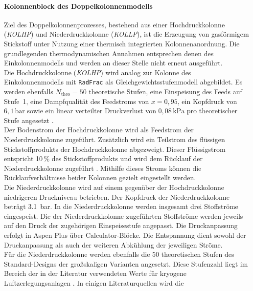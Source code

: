 \paragraph{Kolonnenblock des Doppelkolonnenmodells}\label{sec:modell_kolonne_double} Ziel des Doppelkolonnenprozesses, bestehend aus einer Hochdruckkolonne (\textit{KOLHP}) und Niederdruckkolonne (\textit{KOLLP}), ist die Erzeugung von gasförmigem Stickstoff unter Nutzung einer thermisch integrierten Kolonnenanordnung. Die grundlegenden thermodynamischen Annahmen entsprechen denen des Einkolonnenmodells und werden an dieser Stelle nicht erneut ausgeführt.\\
Die Hochdruckkolonne (\textit{KOLHP}) wird analog zur Kolonne des
Einkolonnenmodells mit \texttt{RadFrac} als Gleichgewichtsstufenmodell
abgebildet. Es werden ebenfalls \(N_{\text{theo}}=50\) theoretische Stufen,
eine Einspeisung des Feeds auf Stufe~1, eine Dampfqualität des Feedstroms von
\(x=0{,}95\), ein Kopfdruck von \(6{,}1\,\mathrm{bar}\) sowie ein linear
verteilter Druckverlust von \(0{,}08\,\mathrm{kPa}\) pro theoretischer Stufe
angesetzt \cite{heinz-wolfgangharingAirGasesNitrogen200}.\\
Der Bodenstrom der Hochdruckkolonne wird als Feedstrom der Niederdruckkolonne zugeführt. Zusätzlich wird ein Teilstrom des flüssigen Stickstoffprodukts der Hochdruckkolonne abgezweigt. Dieser Flüssigstrom entspricht 10\,\% des Stickstoffprodukts und wird dem Rücklauf der Niederdruckkolonne zugeführt \cite{agrawalProductionMediumPressure1991}. Mithilfe dieses Stroms können die Rücklaufverhältnisse beider Kolonnen gezielt eingestellt werden.\\
Die Niederdruckkolonne wird auf einem gegenüber der Hochdruckkolonne niedrigeren Druckniveau betrieben. Der Kopfdruck der Niederdruckkolonne beträgt \SI{3,1}{\bar}. In die Niederdruckkolonne werden insgesamt drei Stoffströme eingespeist.
Die der Niederdruckkolonne zugeführten Stoffströme werden jeweils auf den Druck der zugehörigen Einspeisestufe angepasst. Die Druckanpassung erfolgt in Aspen Plus über Calculator-Blöcke. Die Entspannung dient sowohl der Druckanpassung als auch der weiteren Abkühlung der jeweiligen Ströme.\\
Für die Niederdruckkolonne werden ebenfalls die \(50\) theoretischen Stufen des Standard-Designs der großskaligen Varianten angesetzt. Diese Stufenzahl liegt im Bereich der in der Literatur verwendeten Werte für kryogene Luftzerlegungsanlagen
\cite{teschExergybasedMethodsApplied, agrawalEfficientCryogenicNitrogen1991,
vanderhamExergyAnalysisTwo2010}. In einigen Literaturquellen wird die
